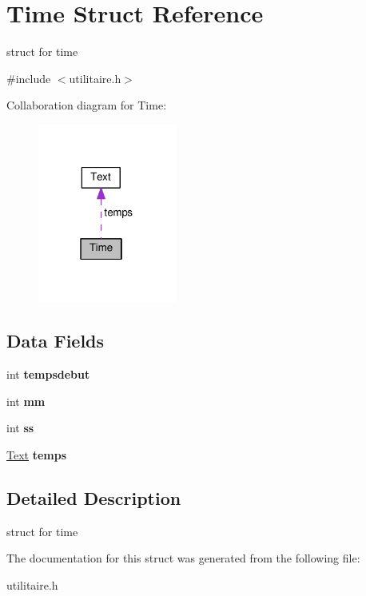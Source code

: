 \hypertarget{structTime}{}\section{Time Struct Reference}
\label{structTime}


struct for time  




{\ttfamily \#include $<$utilitaire.\+h$>$}



Collaboration diagram for Time\+:
\nopagebreak
\begin{figure}[H]
\begin{center}
\leavevmode
\includegraphics[width=130pt]{structTime__coll__graph}
\end{center}
\end{figure}
\subsection*{Data Fields}
\begin{DoxyCompactItemize}
\item 
int {\bfseries tempsdebut}\hypertarget{structTime_a6f3ddd3b01a77b15633b492e6a07664e}{}\label{structTime_a6f3ddd3b01a77b15633b492e6a07664e}

\item 
int {\bfseries mm}\hypertarget{structTime_add7853e0a8e3746cbfc85fe7ba73e00d}{}\label{structTime_add7853e0a8e3746cbfc85fe7ba73e00d}

\item 
int {\bfseries ss}\hypertarget{structTime_a98bc47508851fde020119b90e95784dc}{}\label{structTime_a98bc47508851fde020119b90e95784dc}

\item 
\hyperlink{structText}{Text} {\bfseries temps}\hypertarget{structTime_a5156d0ff2d9afb53bba51b4299402a75}{}\label{structTime_a5156d0ff2d9afb53bba51b4299402a75}

\end{DoxyCompactItemize}


\subsection{Detailed Description}
struct for time 

The documentation for this struct was generated from the following file\+:\begin{DoxyCompactItemize}
\item 
utilitaire.\+h\end{DoxyCompactItemize}
